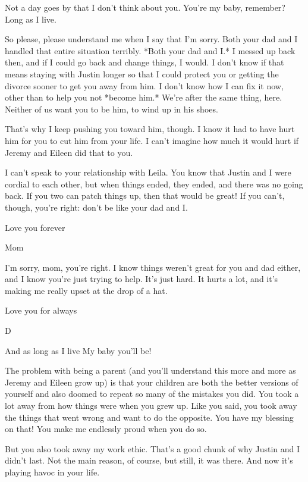 Not a day goes by that I don't think about you. You're my baby, remember? Long as I live.

So please, please understand me when I say that I'm sorry. Both your dad and I handled that entire situation terribly. *Both your dad and I.*  I messed up back then, and if I could go back and change things, I would. I don't know if that means staying with Justin longer so that I could protect you or getting the divorce sooner to get you away from him. I don't know how I can fix it now, other than to help you not *become him.* We're after the same thing, here. Neither of us want you to be him, to wind up in his shoes.

That's why I keep pushing you toward him, though. I know it had to have hurt him for you to cut him from your life. I can't imagine how much it would hurt if Jeremy and Eileen did that to you.

I can't speak to your relationship with Leila. You know that Justin and I were cordial to each other, but when things ended, they ended, and there was no going back. If you two can patch things up, then that would be great! If you can't, though, you're right: don't be like your dad and I.

Love you forever

Mom

\secdiv{}

\noindent I'm sorry, mom, you're right. I know things weren't great for you and dad either, and I know you're just trying to help. It's just hard. It hurts a lot, and it's making me really upset at the drop of a hat.

Love you for always

D

\secdiv{}

\noindent And as long as I live
My baby you'll be!

The problem with being a parent (and you'll understand this more and more as Jeremy and Eileen grow up) is that your children are both the better versions of yourself and also doomed to repeat so many of the mistakes you did. You took a lot away from how things were when you grew up. Like you said, you took away the things that went wrong and want to do the opposite. You have my blessing on that! You make me endlessly proud when you do so.

But you also took away my work ethic. That's a good chunk of why Justin and I didn't last. Not the main reason, of course, but still, it was there. And now it's playing havoc in your life.


